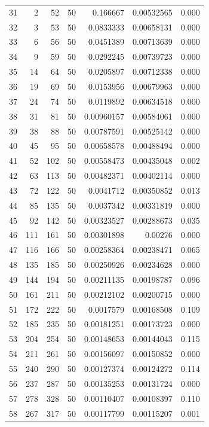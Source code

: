 \begin{tabular}{r r r r r r r}
31 & 2 & 52 & 50 & 0.166667 & 0.00532565 & 0.000 \\
32 & 3 & 53 & 50 & 0.0833333 & 0.00658131 & 0.000 \\
33 & 6 & 56 & 50 & 0.0451389 & 0.00713639 & 0.000 \\
34 & 9 & 59 & 50 & 0.0292245 & 0.00739723 & 0.000 \\
35 & 14 & 64 & 50 & 0.0205897 & 0.00712338 & 0.000 \\
36 & 19 & 69 & 50 & 0.0153956 & 0.00679963 & 0.000 \\
37 & 24 & 74 & 50 & 0.0119892 & 0.00634518 & 0.000 \\
38 & 31 & 81 & 50 & 0.00960157 & 0.00584061 & 0.000 \\
39 & 38 & 88 & 50 & 0.00787591 & 0.00525142 & 0.000 \\
40 & 45 & 95 & 50 & 0.00658578 & 0.00488494 & 0.000 \\
41 & 52 & 102 & 50 & 0.00558473 & 0.00435048 & 0.002 \\
42 & 63 & 113 & 50 & 0.00482371 & 0.00402114 & 0.000 \\
43 & 72 & 122 & 50 & 0.0041712 & 0.00350852 & 0.013 \\
44 & 85 & 135 & 50 & 0.0037342 & 0.00331819 & 0.000 \\
45 & 92 & 142 & 50 & 0.00323527 & 0.00288673 & 0.035 \\
46 & 111 & 161 & 50 & 0.00301898 & 0.00276 & 0.000 \\
47 & 116 & 166 & 50 & 0.00258364 & 0.00238471 & 0.065 \\
48 & 135 & 185 & 50 & 0.00250926 & 0.00234628 & 0.000 \\
49 & 144 & 194 & 50 & 0.00211135 & 0.00198787 & 0.096 \\
50 & 161 & 211 & 50 & 0.00212102 & 0.00200715 & 0.000 \\
51 & 172 & 222 & 50 & 0.0017579 & 0.00168508 & 0.109 \\
52 & 185 & 235 & 50 & 0.00181251 & 0.00173723 & 0.000 \\
53 & 204 & 254 & 50 & 0.00148653 & 0.00144043 & 0.115 \\
54 & 211 & 261 & 50 & 0.00156097 & 0.00150852 & 0.000 \\
55 & 240 & 290 & 50 & 0.00127374 & 0.00124272 & 0.114 \\
56 & 237 & 287 & 50 & 0.00135253 & 0.00131724 & 0.000 \\
57 & 278 & 328 & 50 & 0.00110407 & 0.00108397 & 0.110 \\
58 & 267 & 317 & 50 & 0.00117799 & 0.00115207 & 0.001 \\

\end{tabular}
